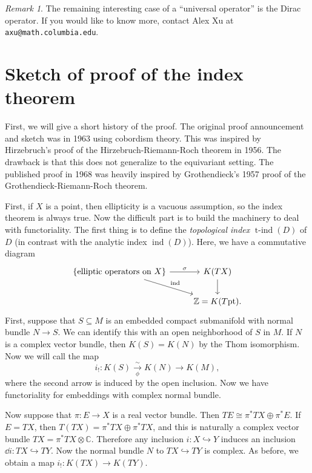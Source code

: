 \documentclass[leqno, openany]{memoir}
\theoremstyle{definition}
\theoremstyle{remark}
\newtheorem{rmk}[thm]{Remark}
\theoremstyle{plain}
\theoremstyle{definition}
\theoremstyle{remark}
\newcommand{\C}{\mathbb{C}}
\newcommand{\Z}{\mathbb{Z}}
\newcommand{\mr}[1]{\mathrm{#1}}
\DeclareMathOperator{\ind}{ind}
\DeclareMathOperator{\tind}{t-ind}
\begin{document}
\begin{rmk}
    The remaining interesting case of a ``universal operator'' is the Dirac operator. If you would like to know more, contact Alex Xu at \texttt{axu@math.columbia.edu}.
\end{rmk}

\section{Sketch of proof of the index theorem}%
\label{sec:sketch_of_proof_of_the_index_theorem}

First, we will give a short history of the proof. The original proof announcement and sketch was in 1963 using cobordism theory. This was inspired by Hirzebruch's proof of the Hirzebruch-Riemann-Roch theorem in 1956. The drawback is that this does not generalize to the equivariant setting. The published proof in 1968 was heavily inspired by Grothendieck's 1957 proof of the Grothendieck-Riemann-Roch theorem.

First, if $X$ is a point, then ellipticity is a vacuous assumption, so the index theorem is always true. Now the difficult part is to build the machinery to deal with functoriality. The first thing is to define the \textit{topological index} $\tind(D)$ of $D$ (in contrast with the analytic index $\ind(D)$). Here, we have a commutative diagram
\begin{equation*}
\begin{tikzcd}
    \qty{\text{elliptic operators on $X$}} \ar{r}{\sigma} \ar{dr}{\ind} & K(TX) \ar{d} \\
                                                                        & \Z = K(T\mr{pt}).
\end{tikzcd}
\end{equation*}
First, suppose that $S \subseteq M$ is an embedded compact submanifold with normal bundle $N \to S$. We can identify this with an open neighborhood of $S$ in $M$. If $N$ is a complex vector bundle, then $K(S) = K(N)$ by the Thom isomorphism. Now we will call the map
\[ i_! \colon K(S) \xrightarrow[\phi]{\sim} K(N) \to K(M), \]
where the second arrow is induced by the open inclusion. Now we have functoriality for embeddings with complex normal bundle.

Now suppose that $\pi \colon E \to X$ is a real vector bundle. Then $TE \cong \pi^* TX \oplus \pi^* E$. If $E = TX$, then $T(TX) = \pi^* TX \oplus \pi^* TX$, and this is naturally a complex vector bundle $TX = \pi^* TX \otimes \C$. Therefore any inclusion $i \colon X \hookrightarrow Y$ induces an inclusion $\dd{i} \colon TX \hookrightarrow TY$. Now the normal bundle $N$ to $TX \hookrightarrow TY$ is complex. As before, we obtain a map $i_! \colon K(TX) \to K(TY)$.
\end{document}
